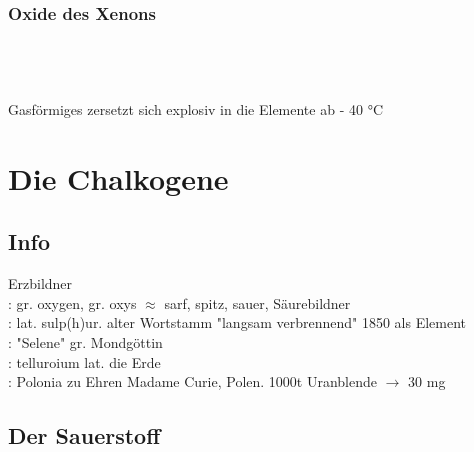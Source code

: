 \documentclass{article}
\begin{document}
\subsubsection{Oxide des Xenons}
\\
\\
\\
Gasförmiges  zersetzt sich explosiv in die Elemente ab - 40 °C\\

\section{Die Chalkogene}
\subsection{Info}
Erzbildner\\
: gr. oxygen, gr. oxys $\approx$ sarf, spitz, sauer, Säurebildner\\
: lat. sulp(h)ur. alter Wortstamm "langsam verbrennend" 1850 als Element\\
: "Selene" gr. Mondgöttin\\
: telluroium lat. die Erde\\
: Polonia zu Ehren Madame Curie, Polen. 1000t Uranblende $\rightarrow$ 30 mg \\

\subsection{Der Sauerstoff}
\end{document}
